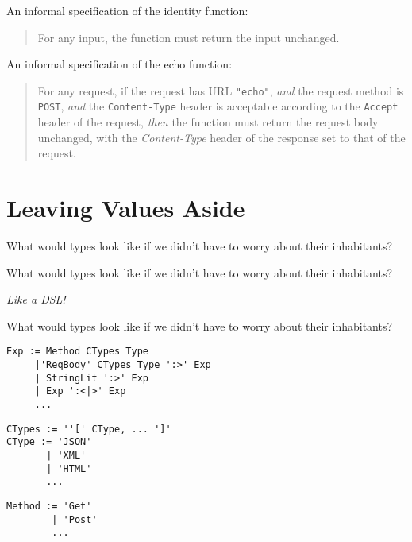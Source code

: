 \documentclass{beamer}
\begin{document}
\begin{frame}[fragile]
    An informal specification of the identity function:
\begin{quotation}
    For any input, the function must return the input unchanged.
\end{quotation}

    An informal specification of the echo function:
\begin{quotation}
    For any request, if the request has URL \texttt{"echo"}, \textit{and} the
    request method is \texttt{POST}, \textit{and} the \texttt{Content-Type}
    header is acceptable according to the \texttt{Accept} header of the request,
    \textit{then} the function must return the request body unchanged, with the
    \textit{Content-Type} header of the response set to that of the request.
\end{quotation}
\end{frame}


\section{Leaving Values Aside}%

\begin{frame}
    What would types look like if we didn't have to worry about their
    inhabitants?
\end{frame}

\begin{frame}
    What would types look like if we didn't have to worry about their
    inhabitants?

    \textit{Like a DSL!}
\end{frame}

\begin{frame}[fragile]
    What would types look like if we didn't have to worry about their
    inhabitants?

\begin{verbatim}
Exp := Method CTypes Type
     |'ReqBody' CTypes Type ':>' Exp
     | StringLit ':>' Exp
     | Exp ':<|>' Exp
     ...
\end{verbatim}

\begin{verbatim}
CTypes := ''[' CType, ... ']'
CType := 'JSON'
       | 'XML'
       | 'HTML'
       ...
\end{verbatim}

\begin{verbatim}
Method := 'Get'
        | 'Post'
        ...
\end{verbatim}
\end{frame}
\end{document}
